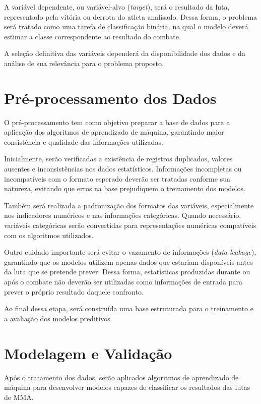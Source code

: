 \documentclass[12pt,a4paper]{report}
\begin{document}
A variável dependente, ou variável-alvo (\textit{target}), será o resultado da luta, representado pela vitória ou derrota do atleta analisado. Dessa forma, o problema será tratado como uma tarefa de classificação binária, na qual o modelo deverá estimar a classe correspondente ao resultado do combate.

A seleção definitiva das variáveis dependerá da disponibilidade dos dados e da análise de sua relevância para o problema proposto.

\section{Pré-processamento dos Dados}

O pré-processamento tem como objetivo preparar a base de dados para a aplicação dos algoritmos de aprendizado de máquina, garantindo maior consistência e qualidade das informações utilizadas.

Inicialmente, serão verificadas a existência de registros duplicados, valores ausentes e inconsistências nos dados estatísticos. Informações incompletas ou incompatíveis com o formato esperado deverão ser tratadas conforme sua natureza, evitando que erros na base prejudiquem o treinamento dos modelos.

Também será realizada a padronização dos formatos das variáveis, especialmente nos indicadores numéricos e nas informações categóricas. Quando necessário, variáveis categóricas serão convertidas para representações numéricas compatíveis com os algoritmos utilizados.

Outro cuidado importante será evitar o vazamento de informações (\textit{data leakage}), garantindo que os modelos utilizem apenas dados que estariam disponíveis antes da luta que se pretende prever. Dessa forma, estatísticas produzidas durante ou após o combate não deverão ser utilizadas como informações de entrada para prever o próprio resultado daquele confronto.

Ao final dessa etapa, será construída uma base estruturada para o treinamento e a avaliação dos modelos preditivos.

\section{Modelagem e Validação}

Após o tratamento dos dados, serão aplicados algoritmos de aprendizado de máquina para desenvolver modelos capazes de classificar os resultados das lutas de MMA.
\end{document}
